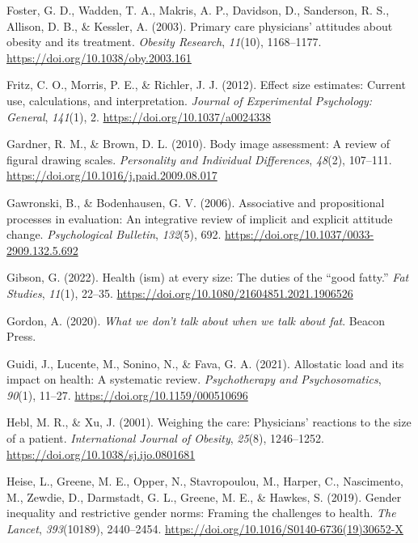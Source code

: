 \documentclass[
  jou,
  longtable,
  nolmodern,
  notxfonts,
  notimes,
  colorlinks=true,linkcolor=blue,citecolor=blue,urlcolor=blue]{apa7}
\newlength{\cslhangindent}
\newenvironment{CSLReferences}[2] %
 {\begin{list}{}{%
  \setlength{\itemindent}{0pt}
  \setlength{\leftmargin}{0pt}
  \setlength{\parsep}{0pt}
  \ifodd #1
   \setlength{\leftmargin}{\cslhangindent}
   \setlength{\itemindent}{-1\cslhangindent}
  \fi
  \setlength{\itemsep}{#2\baselineskip}}}
 {\end{list}}
\begin{document}
\begin{CSLReferences}{1}{0}
Foster, G. D., Wadden, T. A., Makris, A. P., Davidson, D., Sanderson, R.
S., Allison, D. B., \& Kessler, A. (2003). Primary care physicians'
attitudes about obesity and its treatment. \emph{Obesity Research},
\emph{11}(10), 1168--1177. \url{https://doi.org/10.1038/oby.2003.161}

Fritz, C. O., Morris, P. E., \& Richler, J. J. (2012). Effect size
estimates: Current use, calculations, and interpretation. \emph{Journal
of Experimental Psychology: General}, \emph{141}(1), 2.
\url{https://doi.org/10.1037/a0024338}

Gardner, R. M., \& Brown, D. L. (2010). Body image assessment: A review
of figural drawing scales. \emph{Personality and Individual
Differences}, \emph{48}(2), 107--111.
\url{https://doi.org/10.1016/j.paid.2009.08.017}

Gawronski, B., \& Bodenhausen, G. V. (2006). Associative and
propositional processes in evaluation: An integrative review of implicit
and explicit attitude change. \emph{Psychological Bulletin},
\emph{132}(5), 692. \url{https://doi.org/10.1037/0033-2909.132.5.692}

Gibson, G. (2022). Health (ism) at every size: The duties of the {``good
fatty.''} \emph{Fat Studies}, \emph{11}(1), 22--35.
\url{https://doi.org/10.1080/21604851.2021.1906526}

Gordon, A. (2020). \emph{What we don't talk about when we talk about
fat}. Beacon Press.

Guidi, J., Lucente, M., Sonino, N., \& Fava, G. A. (2021). Allostatic
load and its impact on health: A systematic review. \emph{Psychotherapy
and Psychosomatics}, \emph{90}(1), 11--27.
\url{https://doi.org/10.1159/000510696}

Hebl, M. R., \& Xu, J. (2001). Weighing the care: Physicians' reactions
to the size of a patient. \emph{International Journal of Obesity},
\emph{25}(8), 1246--1252. \url{https://doi.org/10.1038/sj.ijo.0801681}

Heise, L., Greene, M. E., Opper, N., Stavropoulou, M., Harper, C.,
Nascimento, M., Zewdie, D., Darmstadt, G. L., Greene, M. E., \& Hawkes,
S. (2019). Gender inequality and restrictive gender norms: Framing the
challenges to health. \emph{The Lancet}, \emph{393}(10189), 2440--2454.
\url{https://doi.org/10.1016/S0140-6736(19)30652-X}


\end{CSLReferences}
\end{document}
